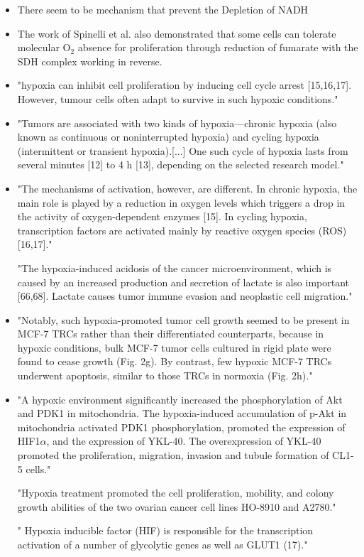 \documentclass[11pt,a4paper]{article}
\begin{document}
\begin{itemize}
\item There seem to be mechanism that prevent the Depletion of NADH \cite{Yan2020}

\item The work of Spinelli et al. also demonstrated that some cells can tolerate molecular O$_{2}$ absence for proliferation through reduction of fumarate with the SDH complex working in reverse. \cite{Spinelli2021}

\item "hypoxia can inhibit cell proliferation by inducing cell cycle arrest [15,16,17]. However, tumour cells often adapt to survive in such hypoxic conditions." \cite{Druker2021}

\item "Tumors are associated with two kinds of hypoxia—chronic hypoxia (also known as continuous or noninterrupted hypoxia) and cycling hypoxia (intermittent or transient hypoxia).[...]  One such cycle of hypoxia lasts from several minutes [12] to 4 h [13], depending on the selected research model."\cite{Korbecki2021}

\item "The mechanisms of activation, however, are different. In chronic hypoxia, the main role is played by a reduction in oxygen levels which triggers a drop in the activity of oxygen-dependent enzymes [15]. In cycling hypoxia, transcription factors are activated mainly by reactive oxygen species (ROS) [16,17]."\cite{Korbecki2021}

"The hypoxia-induced acidosis of the cancer microenvironment, which is caused by an increased production and secretion of lactate is also important [66,68]. Lactate causes tumor immune evasion and neoplastic cell migration."\cite{Korbeck2021}

\item "Notably, such hypoxia-promoted tumor cell growth seemed to be present in MCF-7 TRCs rather than their differentiated counterparts, because in hypoxic conditions, bulk MCF-7 tumor cells cultured in rigid plate were found to cease growth (Fig. 2g). By contrast, few hypoxic MCF-7 TRCs underwent apoptosis, similar to those TRCs in normoxia (Fig. 2h)." \cite{Tang2019}

\item "A hypoxic environment significantly increased the phosphorylation of Akt and PDK1 in mitochondria. The hypoxia-induced accumulation of p-Akt in mitochondria activated PDK1 phosphorylation, promoted the expression of HIF1$\alpha$, and the expression of YKL-40. The overexpression of YKL-40 promoted the proliferation, migration, invasion and tubule formation of CL1-5 cells." \cite{Miao2020}

"Hypoxia treatment promoted the cell proliferation, mobility, and colony growth abilities of the two ovarian cancer cell lines HO-8910 and A2780."\cite{Li2023}

" Hypoxia inducible factor (HIF) is responsible for the transcription activation of a number of glycolytic genes as well as GLUT1 (17)."\cite{Jozwiak2014}
\end{itemize}
\end{document}
